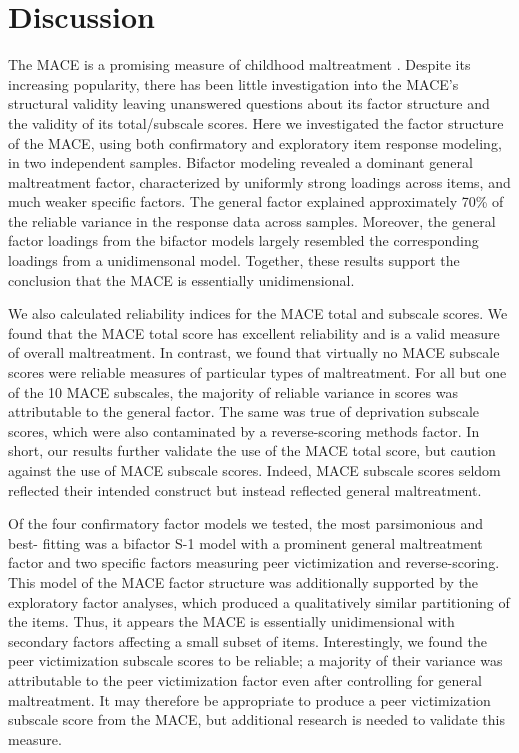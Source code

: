 \documentclass[letterpaper,man,natbib,noextraspace,floatsintext,longtable]{apa6}
\begin{document}
\section{Discussion}

The MACE is a promising measure of childhood maltreatment \citep{georgieva2022systematic}. Despite its increasing popularity, there has been little investigation into the MACE's structural validity \citep{saini2019systematic} leaving unanswered questions about its factor structure and the validity of its total/subscale scores. Here we investigated the factor structure of the MACE, using both confirmatory and exploratory item response modeling, in two independent samples. Bifactor modeling revealed a dominant general maltreatment factor, characterized by uniformly strong loadings across items, and much weaker specific factors. The general factor explained approximately 70\% of the reliable variance in the response data across samples. Moreover, the general factor loadings from the bifactor models largely resembled the corresponding loadings from a unidimensonal model. Together, these results support the conclusion that the MACE is essentially unidimensional. 

We also calculated reliability indices for the MACE total and subscale scores. We found that the MACE total score has excellent reliability and is a valid measure of overall maltreatment. In contrast, we found that virtually no MACE subscale scores were reliable measures of particular types of maltreatment. For all but one of the 10 MACE subscales, the majority of reliable variance in scores was attributable to the general factor. The same was true of deprivation subscale scores, which were also contaminated by a reverse-scoring methods factor. In short, our results further validate the use of the MACE total score, but caution against the use of MACE subscale scores. Indeed, MACE subscale scores seldom reflected their intended construct but instead reflected general maltreatment.

Of the four confirmatory factor models we tested, the most parsimonious and best- fitting was a bifactor S-1 model with a prominent general maltreatment factor and two specific factors measuring peer victimization and reverse-scoring. This model of the MACE factor structure was additionally supported by the exploratory factor analyses, which produced a qualitatively similar partitioning of the items. Thus, it appears the MACE is essentially unidimensional with secondary factors affecting a small subset of items. Interestingly, we found the peer victimization subscale scores to be reliable; a majority of their variance was attributable to the peer victimization factor even after controlling for general maltreatment. It may therefore be appropriate to produce a peer victimization subscale score from the MACE, but additional research is needed to validate this measure.
\end{document}
